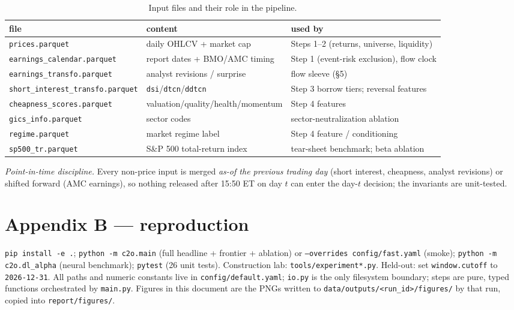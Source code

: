\documentclass[11pt,a4paper]{article}
\newcommand{\code}[1]{\texttt{#1}}
\begin{document}
\begin{table}[h]\centering\small
\caption{Input files and their role in the pipeline.}
\begin{tabular}{lll}
\toprule
file & content & used by\\
\midrule
\code{prices.parquet}                & daily OHLCV + market cap         & Steps 1--2 (returns, universe, liquidity)\\
\code{earnings\_calendar.parquet}    & report dates + BMO/AMC timing    & Step 1 (event-risk exclusion), flow clock\\
\code{earnings\_transfo.parquet}     & analyst revisions / surprise     & flow sleeve (\S5)\\
\code{short\_interest\_transfo.parquet} & \code{dsi}/\code{dtcn}/\code{ddtcn} & Step 3 borrow tiers; reversal features\\
\code{cheapness\_scores.parquet}     & valuation/quality/health/momentum & Step 4 features\\
\code{gics\_info.parquet}            & sector codes                     & sector-neutralization ablation\\
\code{regime.parquet}                & market regime label              & Step 4 feature / conditioning\\
\code{sp500\_tr.parquet}             & S\&P 500 total-return index      & tear-sheet benchmark; beta ablation\\
\bottomrule
\end{tabular}
\end{table}

\noindent\emph{Point-in-time discipline.} Every non-price input is merged \emph{as-of the previous trading day}
(short interest, cheapness, analyst revisions) or shifted forward (AMC earnings), so nothing released after
15:50 ET on day $t$ can enter the day-$t$ decision; the invariants are unit-tested.

\section*{Appendix B --- reproduction}
\code{pip install -e .}; \code{python -m c2o.main} (full headline + frontier + ablation) or
\code{--overrides config/fast.yaml} (smoke); \code{python -m c2o.dl\_alpha} (neural benchmark); \code{pytest}
(26 unit tests). Construction lab: \code{tools/experiment*.py}. Held-out: set \code{window.cutoff} to
\code{2026-12-31}. All paths and numeric constants live in \code{config/default.yaml}; \code{io.py} is the only
filesystem boundary; steps are pure, typed functions orchestrated by \code{main.py}. Figures in this document are
the PNGs written to \code{data/outputs/<run\_id>/figures/} by that run, copied into \code{report/figures/}.
\end{document}
